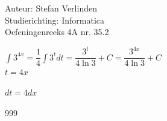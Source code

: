 \documentclass[a4paper]{article}
\begin{document}
  
\noindent \large Auteur: Stefan Verlinden \\
\noindent \large Studierichting: Informatica\\
\noindent \large Oefeningenreeks 4A nr. 35.2\\

\medskip

\normalsize

$\displaystyle\int 3^{4x} = \dfrac{1}{4}\displaystyle\int 3^tdt = \dfrac{3^t}{4\ln{3}}+C =
\dfrac{3^{4x}}{4\ln{3}}+C$\\

$t=4x$\

$dt=4dx$\

\begin{thebibliography}{999}
\end{thebibliography}
\end{document}
